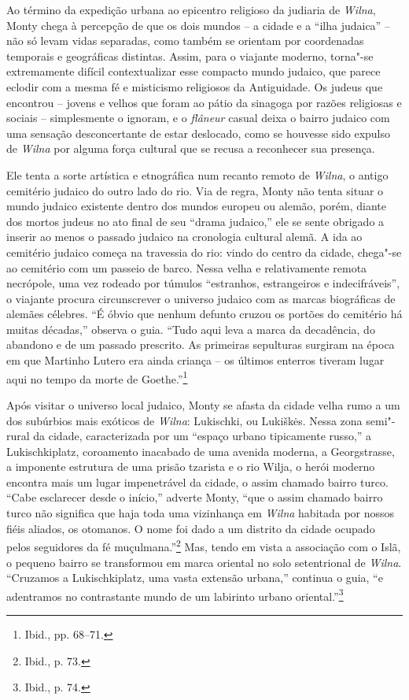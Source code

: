 Ao término da expedição urbana ao epicentro religioso da judiaria de
\textit{Wilna}, Monty chega à percepção de que os dois mundos -- a cidade e a
``ilha judaica'' -- não só levam vidas separadas, como também se orientam
por coordenadas temporais e geográficas distintas. Assim, para o
viajante moderno, torna"-se extremamente difícil contextualizar esse
compacto mundo judaico, que parece eclodir com a mesma fé e misticismo
religiosos da Antiguidade. Os judeus que encontrou -- jovens e velhos que
foram ao pátio da sinagoga por razões religiosas e sociais --
simplesmente o ignoram, e o \textit{flâneur} casual deixa o bairro judaico
com uma sensação desconcertante de estar deslocado, como se houvesse
sido expulso de \textit{Wilna} por alguma força cultural que se recusa a
reconhecer sua presença.

Ele tenta a sorte artística e etnográfica num recanto remoto de \textit{Wilna}, o
antigo cemitério judaico do outro lado do rio. Via de regra, Monty não
tenta situar o mundo judaico existente dentro dos mundos europeu ou
alemão, porém, diante dos mortos judeus no ato final de seu ``drama
judaico,'' ele se sente obrigado a inserir ao menos o passado judaico na
cronologia cultural alemã. A ida ao cemitério judaico começa na
travessia do rio: vindo do centro da cidade, chega"-se ao cemitério com
um passeio de barco. Nessa velha e relativamente remota necrópole, uma
vez rodeado por túmulos ``estranhos, estrangeiros e indecifráveis'', o
viajante procura circunscrever o universo judaico com as marcas
biográficas de alemães célebres. ``É óbvio que nenhum defunto cruzou os
portões do cemitério há muitas décadas,'' observa o guia. ``Tudo aqui
leva a marca da decadência, do abandono e de um passado prescrito. As
primeiras sepulturas surgiram na época em que Martinho Lutero era ainda
criança -- os últimos enterros tiveram lugar aqui no tempo da morte de
Goethe.''\footnote{Ibid., pp. 68--71.}

Após visitar o universo local judaico, Monty se afasta da cidade velha
rumo a um dos subúrbios mais exóticos de \textit{Wilna}: Lukischki, ou Lukiškės.
Nessa zona semi"-rural da cidade, caracterizada por um ``espaço urbano
tipicamente russo,'' a Lukischkiplatz, coroamento inacabado de uma
avenida moderna, a Georgstrasse, a imponente estrutura de uma prisão
tzarista e o rio Wilja, o herói moderno encontra mais um lugar
impenetrável da cidade, o assim chamado bairro turco. ``Cabe esclarecer
desde o início,'' adverte Monty, ``que o assim chamado bairro turco não
significa que haja toda uma vizinhança em \textit{Wilna} habitada por nossos
fiéis aliados, os otomanos. O nome foi dado a um distrito da cidade
ocupado pelos seguidores da fé muçulmana.''\footnote{Ibid., p. 73.} Mas,
tendo em vista a associação com o Islã, o pequeno bairro se transformou
em marca oriental no solo setentrional de \textit{Wilna}. ``Cruzamos a
Lukischkiplatz, uma vasta extensão urbana,'' continua o guia, ``e
adentramos no contrastante mundo de um labirinto urbano
oriental.''\footnote{Ibid., p. 74.}

